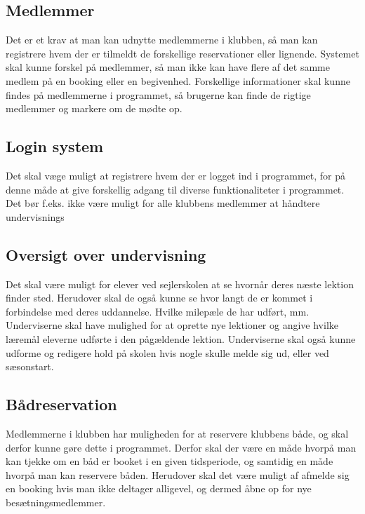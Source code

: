 \subsection{Medlemmer}

Det er et krav at man kan udnytte medlemmerne i klubben, så man kan registrere hvem der er tilmeldt de forskellige reservationer eller lignende. 
Systemet skal kunne forskel på medlemmer, så man ikke kan have flere af det samme medlem på en booking eller en begivenhed.
Forskellige informationer skal kunne findes på medlemmerne i programmet, så brugerne kan finde de rigtige medlemmer og markere om de mødte op.

\subsection{Login system}

Det skal væge muligt at registrere hvem der er logget ind i programmet, for på denne måde at give forskellig adgang til diverse funktionaliteter i programmet.
Det bør f.eks. ikke være muligt for alle klubbens medlemmer at håndtere undervisnings

\subsection{Oversigt over undervisning}

Det skal være muligt for elever ved sejlerskolen at se hvornår deres næste lektion finder sted.
Herudover skal de også kunne se hvor langt de er kommet i forbindelse med deres uddannelse. Hvilke milepæle de har udført, mm.
Underviserne skal have mulighed for at oprette nye lektioner og angive hvilke læremål eleverne udførte i den pågældende lektion. 
Underviserne skal også kunne udforme og redigere hold på skolen hvis nogle skulle melde sig ud, eller ved sæsonstart.

\subsection{Bådreservation}

Medlemmerne i klubben har muligheden for at reservere klubbens både, og skal derfor kunne gøre dette i programmet.
Derfor skal der være en måde hvorpå man kan tjekke om en båd er booket i en given tidsperiode, og samtidig en måde hvorpå man kan reservere båden.
Herudover skal det være muligt af afmelde sig en booking hvis man ikke deltager alligevel, og dermed åbne op for nye besætningsmedlemmer.


